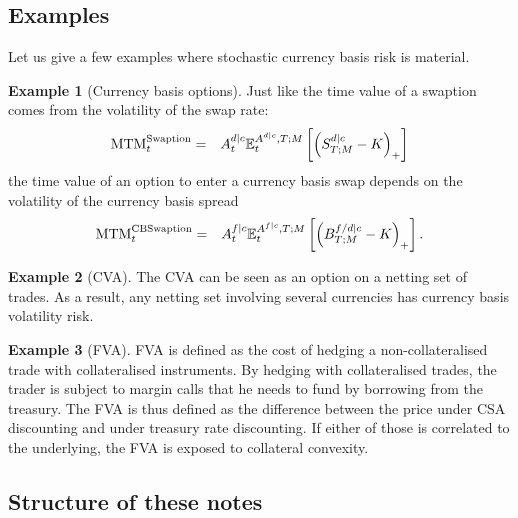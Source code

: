 \documentclass[11pt,english]{amsart}
\newcommand{\MTM}{\mathrm{MTM}}
\newcommand{\EE}{\mathbb{E}}
\theoremstyle{definition}
\newtheorem{exem}{Example}
\begin{document}


\subsection{Examples}
Let us give a few examples where stochastic currency basis risk is material.


\begin{exem}[Currency basis options] 
Just like the time value of a swaption comes from the volatility of the swap rate:
\begin{eqnarray}
  \MTM^{\rm{Swaption}}_t &=& A^{d|c}_t \EE_t^{A^{d|c},T;M}\left[ \left(S^{d|c}_{T;M} - K\right)_+ \right] 
\end{eqnarray}
 the time value of an option to enter a currency basis swap depends on the volatility of the currency basis spread
 \begin{eqnarray}
  \MTM^{\rm{CBSwaption}}_t &=& A^{f|c}_t \EE_t^{A^{f|c},T;M}\left[ \left(B^{f/d|c}_{T;M} - K\right)_+ \right] .
\end{eqnarray}
\end{exem}


\begin{exem}[CVA]
The CVA can be seen as an option on a netting set of trades. As a result, any netting set involving several currencies has currency basis volatility risk. 
\end{exem}


\begin{exem}[FVA] 
FVA is defined as the cost of hedging a non-collateralised trade with collateralised instruments. By hedging with collateralised trades, the trader is subject to margin calls that he needs to fund by borrowing from the treasury. The FVA is thus defined as the difference between the price under CSA discounting and under treasury rate discounting. If either of those is correlated to the underlying, the FVA is exposed to collateral convexity.  
\end{exem}




\subsection{Structure of these notes}
\end{document}
